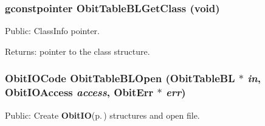 \subsubsection{\setlength{\rightskip}{0pt plus 5cm}gconstpointer Obit\-Table\-BLGet\-Class (void)}\label{ObitTableBL_8h_a13}


Public: Class\-Info pointer. 

\begin{Desc}
\item[Returns:]pointer to the class structure. \end{Desc}
\subsubsection{\setlength{\rightskip}{0pt plus 5cm}Obit\-IOCode Obit\-Table\-BLOpen ({\bf Obit\-Table\-BL} $\ast$ {\em in}, Obit\-IOAccess {\em access}, {\bf Obit\-Err} $\ast$ {\em err})}\label{ObitTableBL_8h_a17}


Public: Create {\bf Obit\-IO}{\rm (p.\,\pageref{structObitIO})} structures and open file. 

